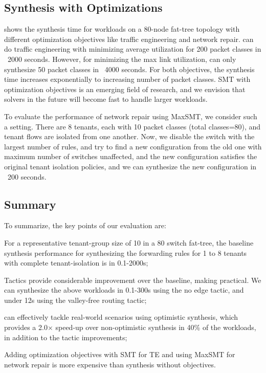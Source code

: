 \subsection{Synthesis with Optimizations} \label{sec:optimizationeval}
 shows the synthesis time for workloads on a 80-node fat-tree topology
with different optimization objectives like traffic engineering and network repair. \name can
 do traffic engineering with minimizing average utilization for 200 packet classes in ~2000 seconds. However,
 for minimizing the max link utilization, \name can only synthesize 50 packet classes in ~4000 seconds. For both
 objectives, the synthesis time increases exponentially to increasing number of packet classes. SMT with
 optimization objectives is an emerging field of research, and we envision that solvers in the future will become fast
 to handle larger workloads. 
 
 To evaluate the performance of network repair using MaxSMT, we consider such a 
 setting. There are 8 tenants, each with 10 packet classes (total classes=80), and tenant
 flows are isolated from one another. Now, we disable the switch with the largest number 
 of rules, and try to find a new configuration from the old one with maximum number of switches
unaffected, and the new configuration satisfies the original tenant isolation policies, and we can
synthesize the new configuration in ~200 seconds. 
\subsection{Summary}
To summarize, the key points of our evaluation are:
\begin{compactitemize}
\item For a representative tenant-group size of 10 in a 80 switch
  fat-tree, the baseline synthesis performance for synthesizing the
  forwarding rules for 1 to 8 tenants with complete tenant-isolation
  is in 0.1-2000s;
      \item Tactics provide considerable improvement over the
        baseline, making \Name practical.  We can synthesize the above
        workloads in 0.1-300s using the no edge tactic,
        and under 12s using the valley-free routing tactic;
      \item \Name can effectively tackle real-world scenarios using
        optimistic synthesis, which provides a 2.0$\times$ speed-up
        over non-optimistic synthesis in 40\% of the workloads, in
        addition to the tactic improvements;
        \item Adding optimization objectives with SMT for TE and using
        MaxSMT for network repair is more expensive than synthesis without
        objectives.
\end{compactitemize}



